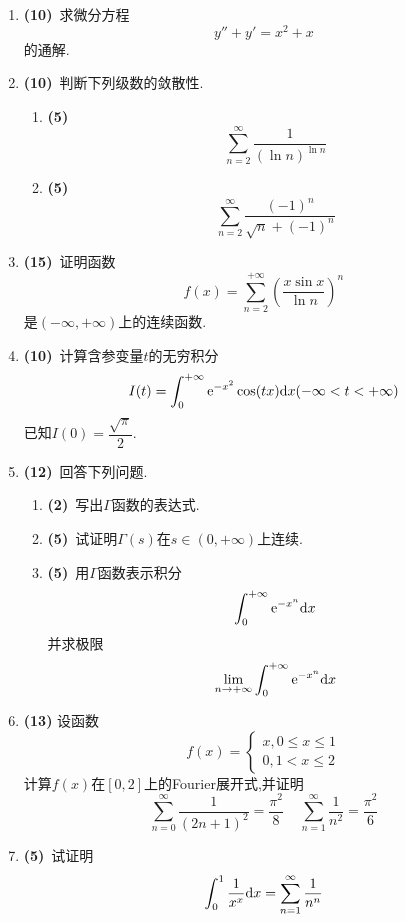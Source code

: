 \documentclass{ctexart}
\begin{document}
\begin{enumerate}[leftmargin=*,label=\textbf{\arabic*.},topsep=0pt,parsep=0pt,itemsep=0pt,partopsep=0pt]
\begin{enumerate}[label=\tbf{(\arabic*)},topsep=0pt,parsep=0pt,itemsep=0pt,partopsep=0pt]
        \end{enumerate}

    \item \textbf{(10)}\ 求微分方程
        \[y''+y'=x^2+x\]
        的通解.

    \item \textbf{(10)}\ 判断下列级数的敛散性.
        \begin{enumerate}[label=\tbf{(\arabic*)},topsep=0pt,parsep=0pt,itemsep=0pt,partopsep=0pt]
            \item \textbf{(5)}
                \[\sum_{n=2}^{\infty}\dfrac{1}{(\ln n)^{\ln n}}\]
            \item \textbf{(5)}
                \[\sum_{n=2}^{\infty}\dfrac{(-1)^n}{\sqrt{n}+(-1)^n}\]

        \end{enumerate}
        
    \item \textbf{(15)}\ 证明函数
        \[f(x)=\sum_{n=2}^{+\infty}\left(\dfrac{x\sin x}{\ln n}\right)^n\]
        是$(-\infty,+\infty)$上的连续函数.

    \item \textbf{(10)}\ 计算含参变量$t$的无穷积分
        \[I(t)=\int_0^{+\infty}\mathrm{e}^{-x^2}\cos(tx)\mathrm{d} x(-\infty<t<+\infty)\]
        已知$I(0)=\dfrac{\sqrt{\pi}}{2}$.

    \item \textbf{(12)}\ 回答下列问题.
        \begin{enumerate}[label=\tbf{(\arabic*)},topsep=0pt,parsep=0pt,itemsep=0pt,partopsep=0pt]
            \item \textbf{(2)}\ 写出$\Gamma$函数的表达式.
            \item \textbf{(5)}\ 试证明$\Gamma(s)$在$s\in(0,+\infty)$上连续.
            \item \textbf{(5)}\ 用$\Gamma$函数表示积分
                \[\int_0^{+\infty}\mathrm{e}^{-x^n}\mathrm{d} x\]
                并求极限
                \[\lim_{n\to+\infty}\int_0^{+\infty}\mathrm{e}^{-x^n}\mathrm{d} x\]

        \end{enumerate}

    \item \textbf{(13)}
        设函数
        \[f(x)=\left\{\begin{array}{l}
            x,0\leqslant x\leqslant 1\\
            0,1<x\leqslant 2
        \end{array}\right.\]
        计算$f(x)$在$[0,2]$上的Fourier展开式,并证明
        \[\sum_{n=0}^{\infty}\dfrac{1}{(2n+1)^2}=\dfrac{\pi^2}{8}\ \ \ \ \ \sum_{n=1}^{\infty}\dfrac{1}{n^2}=\dfrac{\pi^2}{6}\]

    \item \textbf{(5)}\ 试证明
        \[\int_0^1\dfrac{1}{x^x}\mathrm{d} x=\sum_{n=1}^{\infty}\dfrac{1}{n^n}\]
    
\end{enumerate}
\end{document}
